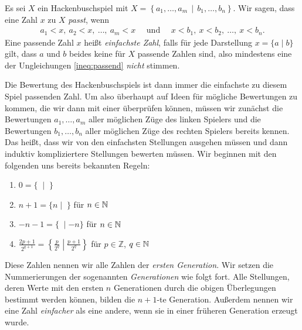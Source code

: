 \documentclass{zirkelbrief1516}
\newcommand{\ZZ}{\mathbb{Z}}
\begin{document}
\begin{definition}
  Es sei $X$ ein Hackenbuschspiel mit $X=\left\{ a_1,\ldots,a_m \,\middle|\, b_1,\ldots,b_n \right\}$. Wir sagen, dass eine Zahl $x$ zu $X$ \emph{passt}, wenn
  \begin{align}\label{ineq:passend}
    a_1<x,~ a_2<x,~ \ldots,~ a_m<x \quad \text{ und } \quad x<b_1,~ x<b_2,~ \ldots,~ x<b_n.
  \end{align}
  Eine passende Zahl $x$ hei\ss t \emph{einfachste Zahl}, falls f\"ur jede Darstellung $x=\{a \mid b\}$ gilt, dass $a$ und $b$ beides keine f\"ur $X$ passende Zahlen sind, also mindestens eine der Ungleichungen \eqref{ineq:passend} \emph{nicht} stimmen.
\end{definition}
Die Bewertung des Hackenbuschspiels ist dann immer die einfachste zu diesem Spiel passenden Zahl. Um also \"uberhaupt auf Ideen f\"ur m\"ogliche Bewertungen zu kommen, die wir dann mit einer \"uberpr\"ufen k\"onnen, m\"ussen wir zun\"achst die Bewertungen $a_1,\ldots,a_m$ aller m\"oglichen Z\"uge des linken Spielers und die Bewertungen $b_1,\ldots,b_n$ aller m\"oglichen Z\"uge des rechten Spielers bereits kennen. Das heißt, dass wir von den einfachsten Stellungen ausgehen müssen und dann induktiv kompliziertere Stellungen bewerten müssen. Wir beginnen mit den folgenden uns bereits bekannten Regeln:
\begin{enumerate}
\item $0=\{\;\mid\;\}$
\item $n+1=\{n\mid\;\}$ für $n\in\mathbb{N}$
\item $-n-1=\{\;\mid -n\}$ für $n\in\mathbb{N}$
\item $\frac{2p+1}{2^{q+1}}=\left\{\frac{p}{2^q}\middle|\frac{p+1}{2^q}\right\}$ für $p\in\ZZ$, $q\in\mathbb{N}$
\end{enumerate}
Diese Zahlen nennen wir alle Zahlen der \emph{ersten Generation}. Wir setzen die Nummerierungen der sogenannten \emph{Generationen} wie folgt fort. Alle Stellungen, deren Werte mit den ersten $n$ Generationen durch die obigen Überlegungen bestimmt werden können, bilden die $n+1$-te Generation. Außerdem nennen wir eine Zahl \emph{einfacher} als eine andere, wenn sie in einer früheren Generation erzeugt wurde.
\end{document}
